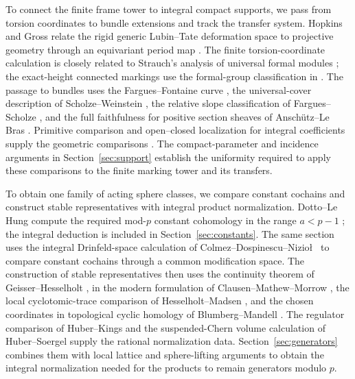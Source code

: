 To connect the finite frame tower to integral compact supports, we
pass from torsion coordinates to bundle extensions and track the transfer
system. Hopkins and Gross relate the rigid generic Lubin--Tate deformation
space to projective geometry through an equivariant period map
\cite[Theorem~1]{HopkinsGross1994}.
The finite torsion-coordinate calculation is closely related to
Strauch's analysis of universal formal modules \cite{Strauch};
the exact-height connected markings use the formal-group
classification in \cite[Lecture~14, Theorem~1]{LurieFormalGroups}.
The passage to bundles uses the Fargues--Fontaine curve
\cite{FarguesFontaine}, the universal-cover description of
Scholze--Weinstein \cite{ScholzeWeinstein}, the relative slope
classification of Fargues--Scholze \cite{FarguesScholze}, and the
full faithfulness for positive section sheaves of
Ansch\"utz--Le Bras \cite{AnschuetzLeBrasFourier}. Primitive comparison
and open--closed localization for integral coefficients supply the
geometric comparisons \cite{ScholzeHodge,PignonYwanne}.
The compact-parameter and incidence arguments in
Section~\ref{sec:support} establish the uniformity required to apply
these comparisons to the finite marking tower and its transfers.

To obtain one family of acting sphere classes, we compare constant
cochains and construct stable representatives with integral product
normalization. Dotto--Le Hung compute the required mod-\(p\) constant
cohomology in the range \(a<p-1\) \cite{DLH}; the integral deduction
is included in Section~\ref{sec:constants}. The same section uses
the integral Drinfeld-space calculation of
Colmez--Dospinescu--Nizio\l\ \cite{CDN} to compare constant cochains
through a common modification space. The construction of stable
representatives then uses the continuity theorem of
Geisser--Hesselholt \cite{GeisserHesselholt}, in the modern formulation
of Clausen--Mathew--Morrow \cite{CMM}, the local cyclotomic-trace
comparison of Hesselholt--Madsen \cite{HesselholtMadsenWitt}, and the
chosen coordinates in topological cyclic homology of
Blumberg--Mandell \cite{BlumbergMandellTC}. The regulator comparison of Huber--Kings
\cite{HuberKings} and the suspended-Chern volume calculation of
Huber--Soergel \cite{HuberSoergel} supply the rational normalization
data. Section~\ref{sec:generators} combines them with local lattice and
sphere-lifting arguments to obtain the integral normalization needed
for the products to remain generators modulo \(p\).

